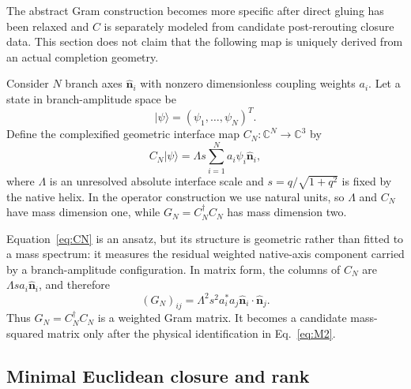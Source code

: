 \documentclass[10pt]{article}
\begin{document}
The abstract Gram construction becomes more specific after direct gluing has been relaxed and $C$ is separately modeled from candidate post-rerouting closure data. This section does not claim that the following map is uniquely derived from an actual completion geometry.

Consider $N$ branch axes $\hat{\bm n}_i$ with nonzero dimensionless coupling weights $a_i$. Let a state in branch-amplitude space be
\begin{equation}
|\psi\rangle=(\psi_1,\ldots,\psi_N)^T.
\end{equation}
Define the complexified geometric interface map $C_N:\mathbb C^N\rightarrow\mathbb C^3$ by
\begin{equation}
\boxed{
C_N|\psi\rangle
=
\Lambda s
\sum_{i=1}^{N}a_i\psi_i\hat{\bm n}_i,
}
\label{eq:CN}
\end{equation}
where $\Lambda$ is an unresolved absolute interface scale and $s=q/\sqrt{1+q^2}$ is fixed by the native helix. In the operator construction we use natural units, so $\Lambda$ and $C_N$ have mass dimension one, while $G_N=C_N^\dagger C_N$ has mass dimension two.

Equation~\eqref{eq:CN} is an ansatz, but its structure is geometric rather than fitted to a mass spectrum: it measures the residual weighted native-axis component carried by a branch-amplitude configuration. In matrix form, the columns of $C_N$ are $\Lambda s a_i\hat{\bm n}_i$, and therefore
\begin{equation}
(G_N)_{ij}
=
\Lambda^2s^2 a_i^*a_j
\hat{\bm n}_i\cdot\hat{\bm n}_j.
\label{eq:Gram}
\end{equation}
Thus $G_N=C_N^\dagger C_N$ is a weighted Gram matrix. It becomes a candidate mass-squared matrix only after the physical identification in Eq.~\eqref{eq:M2}.

\subsection{Minimal Euclidean closure and rank}
\end{document}
